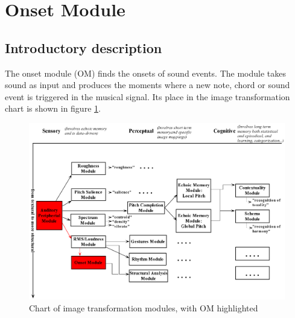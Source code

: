 \newpage
\section{Onset Module}

\hypertarget{Concepts:OnsetModule}{}

\hypertarget{Concepts:IPEMCalcOnsets}{}
\hypertarget{Concepts:IPEMCalcOnsetsFromANI}{}
\hypertarget{Concepts:IPEMDoOnsets}{}
\hypertarget{Concepts:IPEMOnsetPattern}{}
\hypertarget{Concepts:IPEMOnsetPatternFilter}{}
\hypertarget{Concepts:IPEMOnsetPeakDetection}{}
\hypertarget{Concepts:IPEMOnsetPeakDetection1Channel}{}
\hypertarget{Concepts:IPEMSnipSoundFileAtOnsets}{}

\subsection{Introductory description}
The onset module (OM) finds the onsets of sound events. The module
takes sound as input and produces the moments where a new note,
chord or sound event is triggered in the musical signal. Its place
in the image transformation chart is shown in figure
\ref{Fig:ModulesOM}.
\begin{figure}[h]
    \centering
    \includegraphics[width=\textwidth]{Graphics/ModulesOM}
    \caption{Chart of image transformation modules, with OM highlighted}
    \label{Fig:ModulesOM}
\end{figure}

